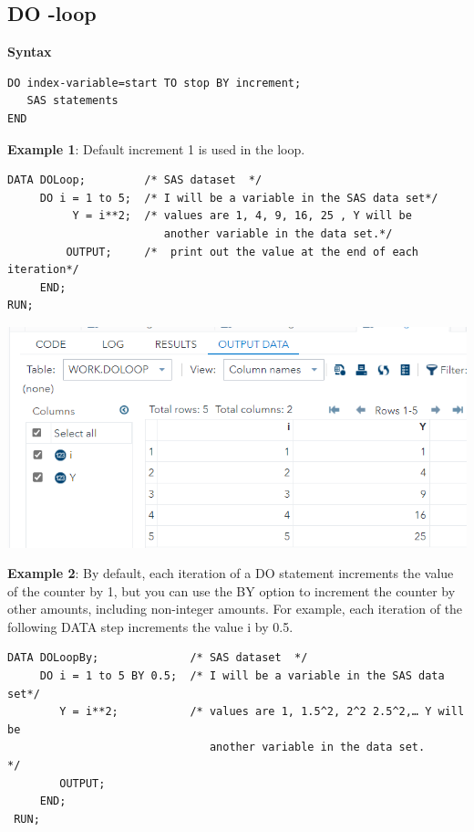\documentclass[
]{book}
\begin{document}
\hypertarget{do--loop}{%
\subsection{DO -loop}\label{do--loop}}

\textbf{Syntax}

\begin{verbatim}
DO index-variable=start TO stop BY increment;
   SAS statements
END 
\end{verbatim}

\textbf{Example 1}: Default increment 1 is used in the loop.

\begin{verbatim}
DATA DOLoop;         /* SAS dataset  */
     DO i = 1 to 5;  /* I will be a variable in the SAS data set*/
          Y = i**2;  /* values are 1, 4, 9, 16, 25 , Y will be
                        another variable in the data set.*/ 
         OUTPUT;     /*  print out the value at the end of each iteration*/
     END;
RUN;
\end{verbatim}

\begin{center}\includegraphics[width=1\linewidth]{img10/w10-DOloop} \end{center}

\textbf{Example 2}: By default, each iteration of a DO statement increments the value of the counter by 1, but you can use the BY option to increment the counter by other amounts, including non-integer amounts. For example, each iteration of the following DATA step increments the value i by 0.5.

\begin{verbatim}
DATA DOLoopBy;              /* SAS dataset  */
     DO i = 1 to 5 BY 0.5;  /* I will be a variable in the SAS data set*/
        Y = i**2;           /* values are 1, 1.5^2, 2^2 2.5^2,… Y will be
                               another variable in the data set.     */ 
        OUTPUT; 
     END;
 RUN;
\end{verbatim}
\end{document}
